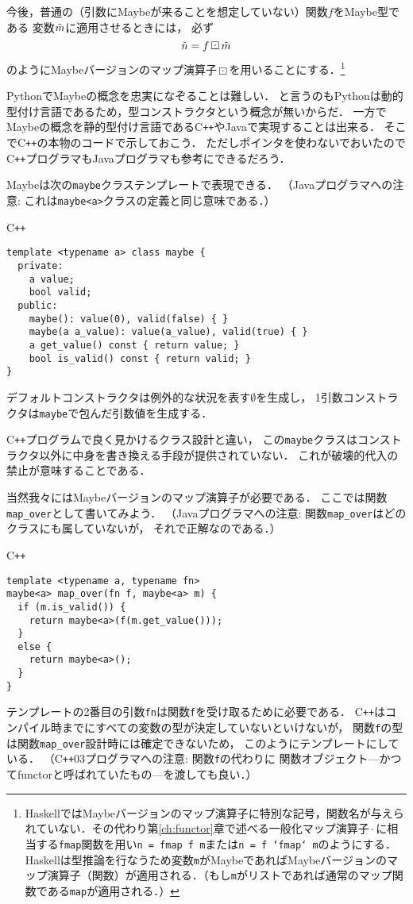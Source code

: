 \documentclass[a5paper,draft]{jsbook}
\newcommand{\programminglanguage}[1]{\textsf{#1}}
\newcommand{\cxx}{\programminglanguage{C}\texttt{++}}
\newcommand{\haskell}{\programminglanguage{Haskell}}
\newcommand{\java}{\programminglanguage{Java}}
\newcommand{\python}{\programminglanguage{Python}}
\newcommand{\code}[1]{\texttt{#1}}
\newenvironment{cxxcode}{\begin{itembox}[r]{\cxx}}{\end{itembox}}
\newcommand{\mathMaybeVar}[1]{\Tilde{#1}}
\newcommand{\mathNothing}{\emptyset}%
\newcommand{\mathBinaryOperator}[1]{\operatorname{#1}}
\newcommand{\mathGeneralMap}{\mathBinaryOperator{\cdot}}
\newcommand{\mathMaybeMap}{\mathBinaryOperator{\boxdot}}
\begin{document}
今後，普通の（引数にMaybeが来ることを想定していない）関数$f$をMaybe型である
変数$\mathMaybeVar{m}$に適用させるときには，
必ず
$$
\mathMaybeVar{n}=f\mathMaybeMap\mathMaybeVar{m}
$$
のようにMaybeバージョンのマップ演算子$\mathMaybeMap$を用いることにする．\footnote{\haskell ではMaybeバージョンのマップ演算子に特別な記号，関数名が与えられていない．その代わり第\ref{ch:functor}章で述べる一般化マップ演算子$\mathGeneralMap$に相当する\code{fmap}関数を用い\code{n = fmap f m}または\code{n = f `fmap` m}のようにする．\haskell は型推論を行なうため変数\code{m}がMaybeであればMaybeバージョンのマップ演算子（関数）が適用される．（もし\code{m}がリストであれば通常のマップ関数である\code{map}が適用される．）}

\python でMaybeの概念を忠実になぞることは難しい．
と言うのも\python は動的型付け言語であるため，型コンストラクタという概念が無いからだ．
一方でMaybeの概念を静的型付け言語である\cxx や\java で実現することは出来る．
そこで\cxx の本物のコードで示しておこう．
ただしポインタを使わないでおいたので\cxx プログラマも\java プログラマも参考にできるだろう．

Maybeは次の\code{maybe}クラステンプレートで表現できる．
（\java プログラマへの注意: これは\code{maybe<a>}クラスの定義と同じ意味である．）
\begin{cxxcode}
\begin{verbatim}
template <typename a> class maybe {
  private:
    a value;
    bool valid;
  public:
    maybe(): value(0), valid(false) { }
    maybe(a a_value): value(a_value), valid(true) { }
    a get_value() const { return value; }
    bool is_valid() const { return valid; }
}
\end{verbatim}
\end{cxxcode}
デフォルトコンストラクタは例外的な状況を表す$\mathNothing$を生成し，
1引数コンストラクタは\code{maybe}で包んだ引数値を生成する．

\cxx プログラムで良く見かけるクラス設計と違い，
この\code{maybe}クラスはコンストラクタ以外に中身を書き換える手段が提供されていない．
これが破壊的代入の禁止が意味することである．

当然我々にはMaybeバージョンのマップ演算子が必要である．
ここでは関数\code{map\_over}として書いてみよう．
（\java プログラマへの注意: 関数\code{map\_over}はどのクラスにも属していないが，
それで正解なのである．）
\begin{cxxcode}
\begin{verbatim}
template <typename a, typename fn>
maybe<a> map_over(fn f, maybe<a> m) {
  if (m.is_valid()) {
    return maybe<a>(f(m.get_value()));
  }
  else {
    return maybe<a>();
  }
}
\end{verbatim}
\end{cxxcode}
テンプレートの2番目の引数\code{fn}は関数\code{f}を受け取るために必要である．
\cxx はコンパイル時までにすべての変数の型が決定していないといけないが，
関数\code{f}の型は関数\code{map\_over}設計時には確定できないため，
このようにテンプレートにしている．
（\cxx03プログラマへの注意: 関数\code{f}の代わりに
関数オブジェクト---かつてfunctorと呼ばれていたもの---を渡しても良い．）
\end{document}
